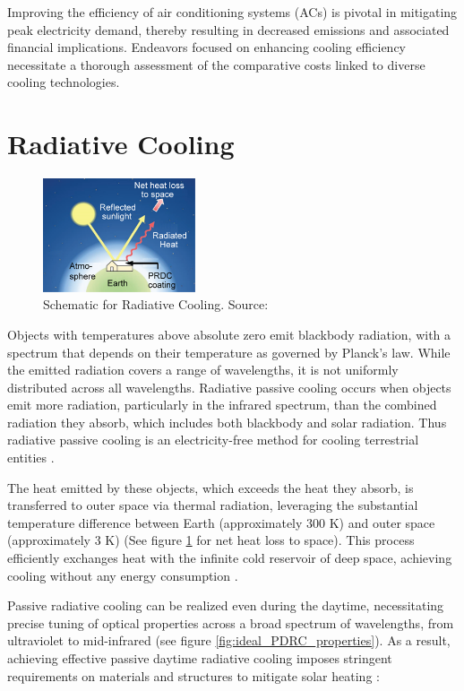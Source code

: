 Improving the efficiency of air conditioning systems (ACs) is pivotal in mitigating peak electricity demand, thereby resulting in decreased emissions and associated financial implications. Endeavors focused on enhancing cooling efficiency necessitate a thorough assessment of the comparative costs linked to diverse cooling technologies.

\section{Radiative Cooling}

\begin{figure}
  \centering
  \includegraphics[width=0.4\textwidth]{Chapters/Figures/Schematic for Radiative Cooling.png}
  \caption[Schematic for Radiative Cooling] {Schematic for Radiative Cooling. Source: \cite{yang_passive_2020}}
  \label{fig:PDRC_Schematic}
\end{figure}

Objects with temperatures above absolute zero emit blackbody radiation, with a spectrum that depends on their temperature as governed by Planck's law. While the emitted radiation covers a range of wavelengths, it is not uniformly distributed across all wavelengths. Radiative passive cooling occurs when objects emit more radiation, particularly in the infrared spectrum, than the combined radiation they absorb, which includes both blackbody and solar radiation. Thus radiative passive cooling is an electricity-free method for cooling terrestrial entities \cite{yang_passive_2020}.

The heat emitted by these objects, which exceeds the heat they absorb, is transferred to outer space via thermal radiation, leveraging the substantial temperature difference between Earth (approximately 300 K) and outer space (approximately 3 K) (See figure \ref{fig:PDRC_Schematic} for net heat loss to space). This process efficiently exchanges heat with the infinite cold reservoir of deep space, achieving cooling without any energy consumption \cite{chen_passive_2022}.

Passive radiative cooling can be realized even during the daytime, necessitating precise tuning of optical properties across a broad spectrum of wavelengths, from ultraviolet to mid-infrared (see figure \ref{fig:ideal_PDRC_properties}). As a result, achieving effective passive daytime radiative cooling imposes stringent requirements on materials and structures to mitigate solar heating \cite{yang_passive_2020}:

